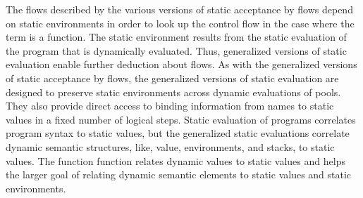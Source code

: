 \documentclass[10pt]{article}
\begin{document}
The flows described by the various versions of static acceptance by flows depend on static
environments in order to look up the control flow in the case where the term is a function.
The static environment
results from the static evaluation of the program that is dynamically evaluated. Thus,
generalized
versions of static evaluation enable further deduction about flows.
As with the generalized versions of static acceptance by flows,
the generalized versions of static evaluation are designed to
preserve static environments across
dynamic evaluations of pools. They also provide direct access to binding information from names
to static values in a fixed number of logical steps. Static evaluation of programs correlates
program syntax to static values, but the generalized static evaluations correlate dynamic
semantic structures, like, value, environments, and stacks, to static values. The function
function relates dynamic values to static values and helps the larger goal of relating dynamic
semantic elements to static values and static environments.    
\end{document}

